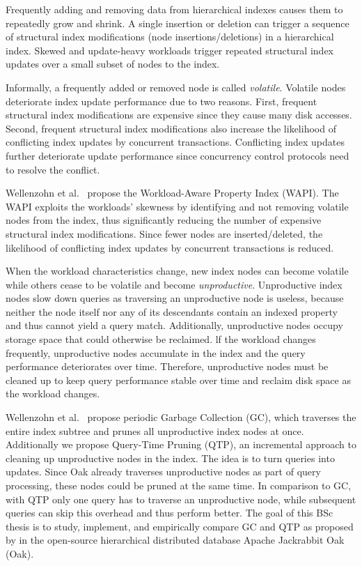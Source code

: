 \documentclass[abstracton,12pt]{scrartcl}
\theoremstyle{definition}
\begin{document}
Frequently adding and removing data from hierarchical indexes causes them to
repeatedly grow and shrink. A single insertion or deletion can trigger a
sequence of structural index modifications (node insertions/deletions) in a
hierarchical index. Skewed and update-heavy workloads trigger repeated
structural index updates over a small subset of nodes to the index.

Informally, a frequently added or removed node is called \textit{volatile}.
Volatile nodes deteriorate index update performance due to two reasons. First,
frequent structural index modifications are expensive since they cause many disk
accesses. Second, frequent structural index modifications also increase the
likelihood of conflicting index updates by concurrent transactions. Conflicting
index updates further deteriorate update performance since concurrency control
protocols need to resolve the conflict.

Wellenzohn et al.~\cite{KW17} propose the Workload-Aware Property Index (WAPI).
The WAPI exploits the workloads' skewness by identifying and not removing
volatile nodes from the index, thus significantly reducing the number of
expensive structural index modifications. Since fewer nodes are
inserted/deleted, the likelihood of conflicting index updates by concurrent
transactions is reduced.

When the workload characteristics change, new index nodes can become volatile
while others cease to be volatile and become \textit{unproductive}. Unproductive
index nodes slow down queries as traversing an unproductive node is useless,
because neither the node itself nor any of its descendants contain an indexed
property and thus cannot yield a query match. Additionally, unproductive nodes
occupy storage space that could otherwise be reclaimed. lf the workload changes
frequently, unproductive nodes accumulate in the index and the query
performance deteriorates over time. Therefore, unproductive nodes must be
cleaned up to keep query performance stable over time and reclaim disk space as
the workload changes.

Wellenzohn et al.~\cite{KW17} propose periodic Garbage Collection (GC), which
traverses the entire index subtree and prunes all unproductive index nodes at
once. Additionally we propose Query-Time Pruning (QTP), an incremental approach
to cleaning up unproductive nodes in the index. The idea is to turn queries into
updates. Since Oak already traverses unproductive nodes as part of query
processing, these nodes could be pruned at the same time. In comparison to GC,
with QTP only one query has to traverse an unproductive node, while subsequent
queries can skip this overhead and thus perform better.
The goal of this BSc thesis is to study, implement, and empirically compare GC
and QTP as proposed by \cite{KW17} in the open-source hierarchical distributed
database Apache Jackrabbit Oak (Oak).
\end{document}

